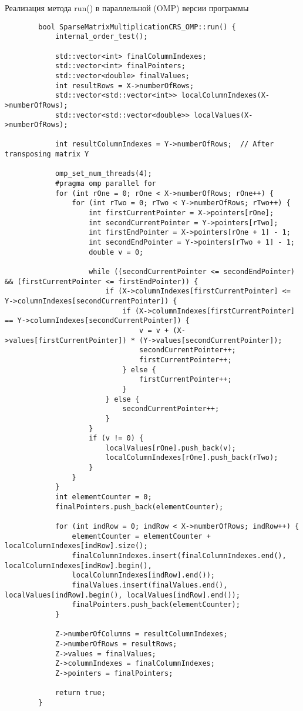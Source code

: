 \documentclass[a4paper, 14pt]{article}
\begin{document}
	Реализация метода run() в параллельной (OMP) версии программы
	\begin{verbatim}
		bool SparseMatrixMultiplicationCRS_OMP::run() {
			internal_order_test();
			
			std::vector<int> finalColumnIndexes;
			std::vector<int> finalPointers;
			std::vector<double> finalValues;
			int resultRows = X->numberOfRows;
			std::vector<std::vector<int>> localColumnIndexes(X->numberOfRows);
			std::vector<std::vector<double>> localValues(X->numberOfRows);
			
			int resultColumnIndexes = Y->numberOfRows;  // After transposing matrix Y
			
			omp_set_num_threads(4);
			#pragma omp parallel for
			for (int rOne = 0; rOne < X->numberOfRows; rOne++) {
				for (int rTwo = 0; rTwo < Y->numberOfRows; rTwo++) {
					int firstCurrentPointer = X->pointers[rOne];
					int secondCurrentPointer = Y->pointers[rTwo];
					int firstEndPointer = X->pointers[rOne + 1] - 1;
					int secondEndPointer = Y->pointers[rTwo + 1] - 1;
					double v = 0;
					
					while ((secondCurrentPointer <= secondEndPointer) && (firstCurrentPointer <= firstEndPointer)) {
						if (X->columnIndexes[firstCurrentPointer] <= Y->columnIndexes[secondCurrentPointer]) {
							if (X->columnIndexes[firstCurrentPointer] == Y->columnIndexes[secondCurrentPointer]) {
								v = v + (X->values[firstCurrentPointer]) * (Y->values[secondCurrentPointer]);
								secondCurrentPointer++;
								firstCurrentPointer++;
							} else {
								firstCurrentPointer++;
							}
						} else {
							secondCurrentPointer++;
						}
					}
					if (v != 0) {
						localValues[rOne].push_back(v);
						localColumnIndexes[rOne].push_back(rTwo);
					}
				}
			}
			int elementCounter = 0;
			finalPointers.push_back(elementCounter);
			
			for (int indRow = 0; indRow < X->numberOfRows; indRow++) {
				elementCounter = elementCounter + localColumnIndexes[indRow].size();
				finalColumnIndexes.insert(finalColumnIndexes.end(), localColumnIndexes[indRow].begin(),
				localColumnIndexes[indRow].end());
				finalValues.insert(finalValues.end(), localValues[indRow].begin(), localValues[indRow].end());
				finalPointers.push_back(elementCounter);
			}
			
			Z->numberOfColumns = resultColumnIndexes;
			Z->numberOfRows = resultRows;
			Z->values = finalValues;
			Z->columnIndexes = finalColumnIndexes;
			Z->pointers = finalPointers;
			
			return true;
		}
	\end{verbatim}
	
\end{document}
